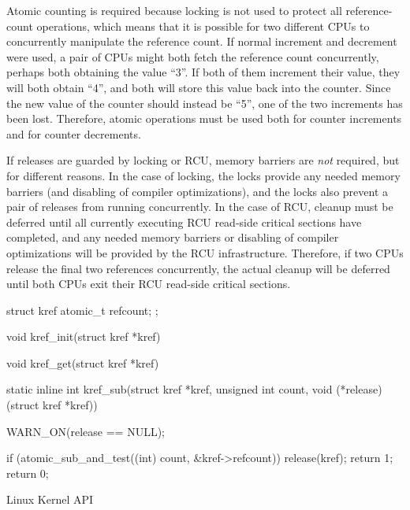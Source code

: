 Atomic counting is required
because locking is not used to protect all reference-count operations,
which means that it is possible for two different CPUs to concurrently
manipulate the reference count.
If normal increment and decrement were used, a pair of CPUs might both
fetch the reference count concurrently, perhaps both obtaining
the value ``3''.
If both of them increment their value, they will both obtain ``4'',
and both will store this value back into the counter.
Since the new value of the counter should instead be ``5'', one
of the two increments has been lost.
Therefore, atomic operations must be used both for counter increments
and for counter decrements.

If releases are guarded by locking or RCU,
memory barriers are \emph{not} required, but for different reasons.
In the case of locking, the locks provide any needed memory barriers
(and disabling of compiler optimizations), and the locks also
prevent a pair of releases from running concurrently.
In the case of RCU, cleanup must be deferred until all currently
executing RCU read-side critical sections have completed, and
any needed memory barriers or disabling of compiler optimizations
will be provided by the RCU infrastructure.
Therefore, if two CPUs release the final two references concurrently,
the actual cleanup will be deferred until both CPUs exit their
RCU read-side critical sections.

\QuickQuizEnd

\begin{listing}[tbp]
\begin{fcvlabel}
\begin{VerbatimL}[commandchars=\\\[\]]
struct kref {						\lnlbl[kref:b]
	atomic_t refcount;
};							\lnlbl[kref:e]

void kref_init(struct kref *kref)										\lnlbl[init:e]

void kref_get(struct kref *kref)										\lnlbl[get:e]

static inline int					\lnlbl[sub:b]
kref_sub(struct kref *kref, unsigned int count,
         void (*release)(struct kref *kref))
{
	WARN_ON(release == NULL);

	if (atomic_sub_and_test((int) count,		\lnlbl[check]
	                        &kref->refcount)) {
		release(kref);				\lnlbl[rel]
		return 1;				\lnlbl[ret:1]
	}
	return 0;
}							\lnlbl[sub:e]
\end{VerbatimL}
\end{fcvlabel}
\caption{Linux Kernel  API}
\label{lst:together:Linux Kernel kref API}
\end{listing}

